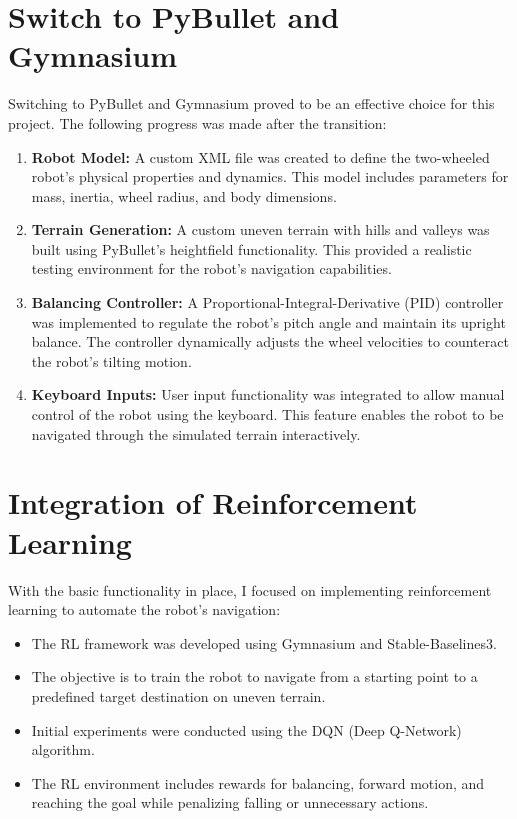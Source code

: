 \documentclass[12pt]{article}
\begin{document}
\section*{Switch to PyBullet and Gymnasium}
Switching to PyBullet and Gymnasium proved to be an effective choice for this project. The following progress was made after the transition:
\begin{enumerate}
    \item \textbf{Robot Model:} A custom XML file was created to define the two-wheeled robot's physical properties and dynamics. This model includes parameters for mass, inertia, wheel radius, and body dimensions.
    \item \textbf{Terrain Generation:} A custom uneven terrain with hills and valleys was built using PyBullet's heightfield functionality. This provided a realistic testing environment for the robot's navigation capabilities.
    \item \textbf{Balancing Controller:} A Proportional-Integral-Derivative (PID) controller was implemented to regulate the robot's pitch angle and maintain its upright balance. The controller dynamically adjusts the wheel velocities to counteract the robot's tilting motion.
    \item \textbf{Keyboard Inputs:} User input functionality was integrated to allow manual control of the robot using the keyboard. This feature enables the robot to be navigated through the simulated terrain interactively.
\end{enumerate}

\section*{Integration of Reinforcement Learning}
With the basic functionality in place, I focused on implementing reinforcement learning to automate the robot's navigation:
\begin{itemize}
    \item The RL framework was developed using Gymnasium and Stable-Baselines3.
    \item The objective is to train the robot to navigate from a starting point to a predefined target destination on uneven terrain.
    \item Initial experiments were conducted using the DQN (Deep Q-Network) algorithm. 
    \item The RL environment includes rewards for balancing, forward motion, and reaching the goal while penalizing falling or unnecessary actions.
\end{itemize}
\end{document}
